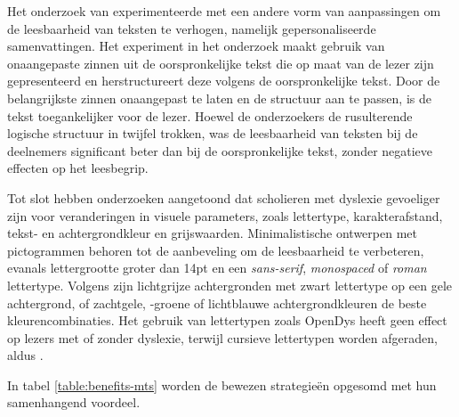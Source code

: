 \medspace

Het onderzoek van \textcite{Nandhini2013} experimenteerde met een andere vorm van aanpassingen om de leesbaarheid van teksten te verhogen, namelijk gepersonaliseerde samenvattingen. Het experiment in het onderzoek maakt gebruik van onaangepaste zinnen uit de oorspronkelijke tekst die op maat van de lezer zijn gepresenteerd en herstructureert deze volgens de oorspronkelijke tekst. Door de belangrijkste zinnen onaangepast te laten en de structuur aan te passen, is de tekst toegankelijker voor de lezer. Hoewel de onderzoekers de rusulterende logische structuur in twijfel trokken, was de leesbaarheid van teksten bij de deelnemers significant beter dan bij de oorspronkelijke tekst, zonder negatieve effecten op het leesbegrip.

\medspace

Tot slot hebben onderzoeken aangetoond dat scholieren met dyslexie gevoeliger zijn voor veranderingen in visuele parameters, zoals lettertype, karakterafstand, tekst- en achtergrondkleur en grijswaarden. Minimalistische ontwerpen met pictogrammen behoren tot de aanbeveling om de leesbaarheid te verbeteren, evanals lettergrootte groter dan 14pt en een \textit{sans-serif}, \textit{monospaced} of \textit{roman} lettertype. Volgens \textcite{Rello2015, Bezem2016, Rello2017} zijn lichtgrijze achtergronden met zwart lettertype op een gele achtergrond, of zachtgele, -groene of lichtblauwe achtergrondkleuren de beste kleurencombinaties. Het gebruik van lettertypen zoals OpenDys heeft geen effect op lezers met of zonder dyslexie, terwijl cursieve lettertypen worden afgeraden, aldus \textcite{Rello2013b, Rello2015}.

\medspace

In tabel \ref{table:benefits-mts} worden de bewezen strategieën opgesomd met hun samenhangend voordeel.

\medspace

